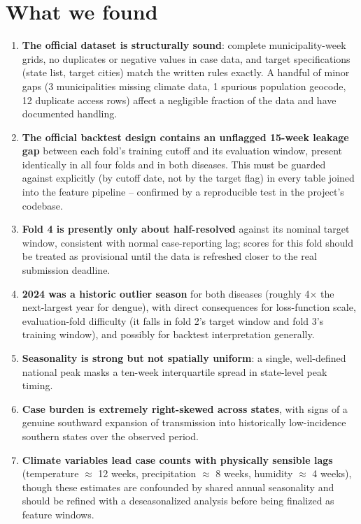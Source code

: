 \documentclass[11pt]{report}
\begin{document}
\section{What we found}
\begin{enumerate}
\item \textbf{The official dataset is structurally sound}: complete municipality-week grids, no duplicates or negative values in case data, and target specifications (state list, target cities) match the written rules exactly. A handful of minor gaps (3 municipalities missing climate data, 1 spurious population geocode, 12 duplicate access rows) affect a negligible fraction of the data and have documented handling.
\item \textbf{The official backtest design contains an unflagged 15-week leakage gap} between each fold's training cutoff and its evaluation window, present identically in all four folds and in both diseases. This must be guarded against explicitly (by cutoff date, not by the target flag) in every table joined into the feature pipeline -- confirmed by a reproducible test in the project's codebase.
\item \textbf{Fold 4 is presently only about half-resolved} against its nominal target window, consistent with normal case-reporting lag; scores for this fold should be treated as provisional until the data is refreshed closer to the real submission deadline.
\item \textbf{2024 was a historic outlier season} for both diseases (roughly 4$\times$ the next-largest year for dengue), with direct consequences for loss-function scale, evaluation-fold difficulty (it falls in fold 2's target window and fold 3's training window), and possibly for backtest interpretation generally.
\item \textbf{Seasonality is strong but not spatially uniform}: a single, well-defined national peak masks a ten-week interquartile spread in state-level peak timing.
\item \textbf{Case burden is extremely right-skewed across states}, with signs of a genuine southward expansion of transmission into historically low-incidence southern states over the observed period.
\item \textbf{Climate variables lead case counts with physically sensible lags} (temperature $\approx$ 12 weeks, precipitation $\approx$ 8 weeks, humidity $\approx$ 4 weeks), though these estimates are confounded by shared annual seasonality and should be refined with a deseasonalized analysis before being finalized as feature windows.

\end{enumerate}
\end{document}
